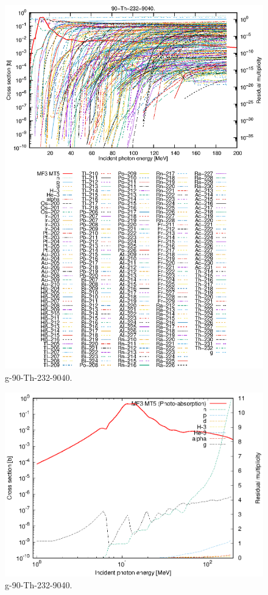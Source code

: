 \begin{figure}
 \includegraphics[width=\linewidth]{eps/g_90-Th-232_9040.eps}
  \caption{g-90-Th-232-9040.}
\end{figure}
\newpage \clearpage

\begin{figure}
 \includegraphics[width=\linewidth]{eps-log/g_90-Th-232_9040.eps}
 \caption{g-90-Th-232-9040.}
\end{figure}
\newpage \clearpage

